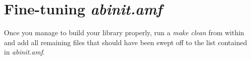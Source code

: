 \section{Fine-tuning \textit{abinit.amf}}

Once you manage to build your library properly, run a \textit{make
clean} from within and add all remaining files that should have been
swept off to the list contained in \textit{abinit.amf}.
